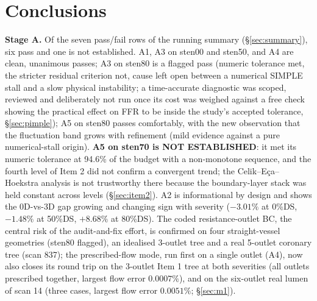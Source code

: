 \documentclass[11pt]{article}
\begin{document}
\section{Conclusions}
\textbf{Stage A.} Of the seven pass/fail rows of the running summary (\S\ref{sec:summary}), six pass and one is not established. A1, A3 on sten00 and sten50, and A4 are clean, unanimous passes; A3 on sten80 is a flagged pass (numeric tolerance met, the stricter residual criterion not, cause left open between a numerical SIMPLE stall and a slow physical instability; a time-accurate diagnostic was scoped, reviewed and deliberately not run once its cost was weighed against a free check showing the practical effect on FFR to be inside the study's accepted tolerance, \S\ref{sec:pimple}); A5 on sten80 passes comfortably, with the new observation that the fluctuation band grows with refinement (mild evidence against a pure numerical-stall origin). \textbf{A5 on sten70 is NOT ESTABLISHED}: it met its numeric tolerance at 94.6\% of the budget with a non-monotone sequence, and the fourth level of Item 2 did not confirm a convergent trend; the Celik--Eça--Hoekstra analysis is not trustworthy there because the boundary-layer stack was held constant across levels (\S\ref{sec:item2}). A2 is informational by design and shows the 0D-vs-3D gap growing and changing sign with severity ($-3.01\%$ at 0\%DS, $-1.48\%$ at 50\%DS, $+8.68\%$ at 80\%DS). The coded resistance-outlet BC, the central risk of the audit-and-fix effort, is confirmed on four straight-vessel geometries (sten80 flagged), an idealised 3-outlet tree and a real 5-outlet coronary tree (scan 837); the prescribed-flow mode, run first on a single outlet (A4), now also closes its round trip on the 3-outlet Item 1 tree at both severities (all outlets prescribed together, largest flow error $0.0007\%$), and on the six-outlet real lumen of scan 14 (three cases, largest flow error $0.0051\%$; \S\ref{sec:m1}).
\end{document}
